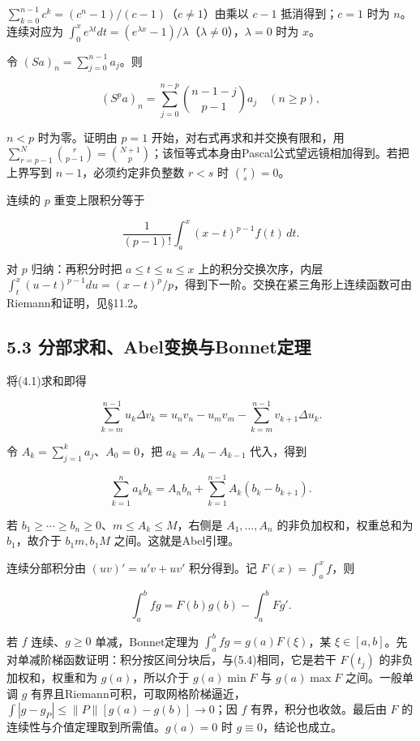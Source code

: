 \documentclass[11pt,a4paper]{article}
\begin{document}
\(\sum_{k=0}^{n-1}c^k=(c^n-1)/(c-1)\)（\(c\ne1\)）由乘以 \(c-1\)
抵消得到；\(c=1\) 时为 \(n\)。连续对应为
\(\int_0^xe^{\lambda t}dt=(e^{\lambda x}-1)/\lambda\)（\(\lambda\ne0\)），\(\lambda=0\)
时为 \(x\)。

令 \((Sa)_n=\sum_{j=0}^{n-1}a_j\)。则

\[
(S^pa)_n=\sum_{j=0}^{n-p}\binom{n-1-j}{p-1}a_j\quad(n\ge p),\tag{5.1}
\]

\(n<p\) 时为零。证明由 \(p=1\) 开始，对右式再求和并交换有限和，用
\(\sum_{r=p-1}^{N}\binom r{p-1}=\binom{N+1}p\)；该恒等式本身由Pascal公式望远镜相加得到。若把上界写到
\(n-1\)，必须约定非负整数 \(r<s\) 时 \(\binom rs=0\)。

连续的 \(p\) 重变上限积分等于

\[
\frac1{(p-1)!}\int_a^x(x-t)^{p-1}f(t)\,dt.\tag{5.2}
\]

对 \(p\) 归纳：再积分时把 \(a\le t\le u\le x\) 上的积分交换次序，内层
\(\int_t^x(u-t)^{p-1}du=(x-t)^p/p\)，得到下一阶。交换在紧三角形上连续函数可由Riemann和证明，见§11.2。

\subsection{5.3
分部求和、Abel变换与Bonnet定理}\label{ux5206ux90e8ux6c42ux548cabelux53d8ux6362ux4e0ebonnetux5b9aux7406}

将(4.1)求和即得

\[
\sum_{k=m}^{n-1}u_k\Delta v_k
=u_nv_n-u_mv_m-\sum_{k=m}^{n-1}v_{k+1}\Delta u_k.\tag{5.3}
\]

令 \(A_k=\sum_{j=1}^ka_j\)、\(A_0=0\)，把 \(a_k=A_k-A_{k-1}\) 代入，得到

\[
\sum_{k=1}^na_kb_k=A_nb_n+\sum_{k=1}^{n-1}A_k(b_k-b_{k+1}).\tag{5.4}
\]

若 \(b_1\ge\cdots\ge b_n\ge0\)、\(m\le A_k\le M\)，右侧是
\(A_1,\ldots,A_n\) 的非负加权和，权重总和为 \(b_1\)，故介于
\(b_1m,b_1M\) 之间。这就是Abel引理。

连续分部积分由 \((uv)'=u'v+uv'\) 积分得到。记 \(F(x)=\int_a^xf\)，则

\[
\int_a^bfg=F(b)g(b)-\int_a^bFg'.\tag{5.5}
\]

若 \(f\) 连续、\(g\ge0\) 单减，Bonnet定理为
\(\int_a^bfg=g(a)F(\xi)\)，某
\(\xi\in[a,b]\)。先对单减阶梯函数证明：积分按区间分块后，与(5.4)相同，它是若干
\(F(t_j)\) 的非负加权和，权重和为 \(g(a)\)，所以介于 \(g(a)\min F\) 与
\(g(a)\max F\) 之间。一般单调 \(g\)
有界且Riemann可积，可取网格阶梯逼近，\(\int|g-g_P|\le\|P\|[g(a)-g(b)]\to0\)；因
\(f\) 有界，积分也收敛。最后由 \(F\)
的连续性与介值定理取到所需值。\(g(a)=0\) 时 \(g\equiv0\)，结论也成立。
\end{document}
